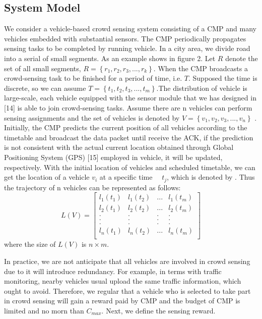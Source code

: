 \documentclass[journal]{IEEEtran}
\begin{document}
\subsection{System Model }
We consider a vehicle-based crowd sensing system consisting of a CMP and many vehicles embedded with substantial sensors. The CMP periodically propagates sensing tasks to be completed by running vehicle. 
In a city area, we divide road into a serial of small segments. As an example shows in figure 2. Let $R$ denote the set of all small segments, $R=\left \{ r_{1},r_{2},r_{3},...,r_{k} \right \}$. When the CMP broadcasts a crowd-sensing task to be finished for a period of time, i.e. $T$. Supposed the time is discrete, so we can assume $T=\left \{ t_{1},t_{2},t_{3},...,t_{m} \right \}$.The distribution of vehicle is large-scale, each vehicle equipped with the sensor module that we has designed in [14] is able to join crowd-sensing tasks. Assume there are n vehicles can perform sensing assignments and the set of vehicles is denoted by $V=\left \{ v_{1},v_{2},v_{3},...,v_{n}\right \}$ . Initially, the CMP predicts the current position of all vehicles according to the timetable and broadcast the data packet until receive the ACK, if the prediction is not consistent with the actual current location obtained through Global Positioning System (GPS) [15] employed in vehicle, it will be updated, respectively.  With the initial location of vehicles and scheduled timetable, we can get the location of a vehicle $v_{i}$ at a specific time　 $t_{j}$, which is denoted by  . Thus the trajectory of n vehicles can be represented as follows:
\setcounter{equation}{0}
\begin{equation}
L(V)=\begin{bmatrix}
l_{1}(t_{1})&l_{1}(t_{2})&... & l_{1}(t_{m})\\ 
l_{2}(t_{1})&l_{2}(t_{2})&... & l_{2}(t_{m})\\
.&. &.&.\\ 
.&. &.&.\\
.&. &.&.\\
l_{n}(t_{1})&l_{n}(t_{2})&... & l_{n}(t_{m})\\
\end{bmatrix}
\end{equation}
where the size of $L(V)$ is $n\times m$.


In practice, we are not anticipate that all vehicles are involved in crowd sensing due to it will introduce redundancy. For example, in terms with traffic monitoring, nearby vehicles usual upload the same traffic information, which ought to avoid. Therefore, we regular that a vehicle who is selected to take part in crowd sensing will gain a reward paid by CMP and the budget of CMP is limited and no morn than $C_{max}$. Next, we define the sensing reward.
\end{document}
